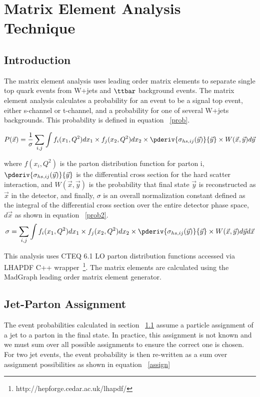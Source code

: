 \section{Matrix Element Analysis Technique} 

\subsection{Introduction}
\label{me_intro}
The matrix element analysis uses leading order matrix elements to separate single top quark events from W+jets and $\ttbar$ background events. The matrix element analysis calculates a probability for an event to be a signal top event, either s-channel or t-channel, and a probability for one of several W+jets backgrounds. This probability is defined in equation ~\ref{prob}.

\begin{equation}
\label{prob}
P(\vec{x}) = \frac{1}{\sigma} \sum_{i,j} \int f_{i}(x_{1}, Q^{2})dx_{1}
\times 
f_{j}(x_{2}, Q^{2})dx_{2} \times \pderiv{\sigma_{hs,ij}(\vec{y})}{\vec{y}} \times W(\vec{x},\vec{y})d\vec{y}
\end{equation}

where $f(x_{i},Q^{2})$ is the parton distribution function for parton i,  $\pderiv{\sigma_{hs,ij}(\vec{y})}{\vec{y}}$ is the differential cross section for the hard scatter interaction, and $W(\vec{x},\vec{y})$ is the probability that final state $\vec{y}$ is reconstructed as $\vec{x}$ in the detector, and finally, $\sigma$ is an overall normalization constant defined as the integral of the differential cross section over the entire detector phase space, $d\vec{x}$ as shown in equation ~\ref{prob2}.
\begin{equation}
\label{prob2}
\sigma = \sum_{i,j} \int f_{i}(x_{1}, Q^{2})dx_{1}
\times 
f_{j}(x_{2}, Q^{2})dx_{2} \times \pderiv{\sigma_{hs,ij}(\vec{y})}{\vec{y}} \times W(\vec{x},\vec{y})d\vec{y}d\vec{x}
\end{equation}

This analysis uses CTEQ 6.1 LO parton distribution functions accessed via
LHAPDF C++ wrapper~\footnote{http://hepforge.cedar.ac.uk/lhapdf/}. The matrix elements are calculated using the MadGraph leading order
matrix element generator.

\subsection{Jet-Parton Assignment}
The event probabilities calculated in section ~\ref{me_intro} assume a particle assignment of a jet to a parton in the final state. In practice, this assignment is not known and we must sum over all possible assignments to ensure the correct one is chosen.
For two jet events, the event probability is then re-written as a sum over assignment possibilities as shown in equation ~\ref{assign}

